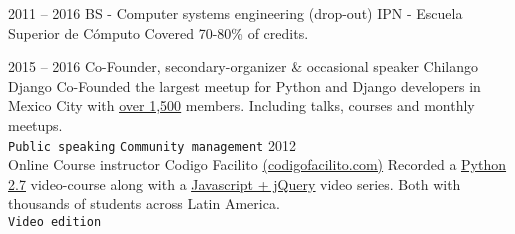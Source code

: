 \documentclass[9pt]{developercv} %
\begin{document}


\begin{entrylist}
    \entry
        {2011 -- 2016}
        {BS - Computer systems engineering (drop-out)}
        {IPN - Escuela Superior de Cómputo}
        {Covered 70-80\% of credits.}
\end{entrylist}



\begin{entrylist}
    \entry
        {2015 -- 2016}
        {Co-Founder, secondary-organizer \& occasional speaker}
        {Chilango Django}
        {
            Co-Founded the largest meetup for Python and Django developers in Mexico
            City with
            {\href{https://meetup.com/Chilango-Django/}{\underline{over 1,500}}}
            members. Including talks, courses and monthly meetups.\\
                \texttt{Public speaking}\slashsep
                \texttt{Community management}
        }
    \entry
        {2012\\\footnotesize{Online}}
        {Course instructor}
        {Codigo Facilito {\href{(https://codigofacilito.com/}{(codigofacilito.com)}}}
        {Recorded a {\href{https://www.youtube.com/watch?v=CjmzDHMHxwU&list=PLE549A038CF82905F}{\underline{Python 2.7}}} video-course along with a {\href{https://www.youtube.com/watch?v=jKbjblt4NXA&list=PLpOqH6AE0tNi47LF-_6gddgq10lp_TLDB}{\underline{Javascript + jQuery}}}
        video series. Both with thousands of students across Latin America.\\
                \texttt{Video edition}
        }
\end{entrylist}
\end{document}
